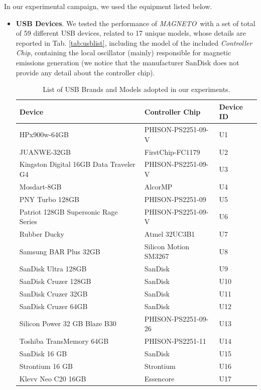 \documentclass[acmsmall, authorversion]{acmart}
\newcommand{\sol}{\emph{MAGNETO}}
\begin{document}
In our experimental campaign, we used the equipment listed below.
\begin{itemize}
\item \textbf{USB Devices}. We tested the performance of \sol\ with a set of total of 59 different USB devices, related to 17 unique models, whose details are reported in Tab. \ref{tab:usblist}, including the model of the included \emph{Controller Chip}, containing the local oscillator (mainly) responsible for magnetic emissions generation (we notice that the manufacturer SanDisk does not provide any detail about the controller chip).
\begin{table}[htbp]
\centering
\color{black}
\caption{List of USB Brands and Models adopted in our experiments.}
\begin{tabular}{|l|l|l|}
\hline
\textbf{Device} & \textbf{Controller Chip} & \textbf{Device ID} \\ \hline
HPx900w-64GB \cite{HP}& PHISON-PS2251-09-V & U1 \\ \hline 
JUANWE-32GB \cite{JU} & FirstChip-FC1179 & U2 \\ \hline
 Kingston Digital 16GB Data Traveler G4 \cite{KD} & PHISON-PS2251-09-V & U3 \\ \hline
Mosdart-8GB \cite{MD} & AlcorMP & U4 \\ \hline
PNY Turbo 128GB \cite{PNY} & PHISON-PS2251-09 & U5 \\ \hline
Patriot 128GB Supersonic Rage Series \cite{PR} & PHISON-PS2251-09-V & U6 \\ \hline
Rubber Ducky \cite{RubberDucky} & Atmel 32UC3B1 & U7 \\ \hline
Samsung BAR Plus 32GB \cite{SB} & Silicon Motion SM3267 & U8 \\ \hline
SanDisk Ultra 128GB \cite{SU}& SanDisk & U9 \\ \hline
SanDisk Cruzer 128GB \cite{S128} & SanDisk & U10 \\ \hline
SanDisk Cruzer 32GB \cite{S32} & SanDisk & U11 \\ \hline
SanDisk Cruzer 64GB \cite{SD} & SanDisk & U12 \\ \hline
Silicon Power 32 GB Blaze B30 \cite{SP} & PHISON-PS2251-09-26 & U13 \\ \hline
Toshiba TransMemory 64GB \cite{TO} & PHISON-PS2251-11 & U14 \\ \hline
SanDisk 16 GB \cite{S16GB} & SanDisk  & U15 \\ \hline
Strontium 16 GB \cite{StrontiumUSB} & Strontium  & U16 \\ \hline
Klevv Neo C20 16GB \cite{KlevvNeo} & Essencore & U17 \\ \hline


\end{tabular}
\end{table}
\end{itemize}
\end{document}
